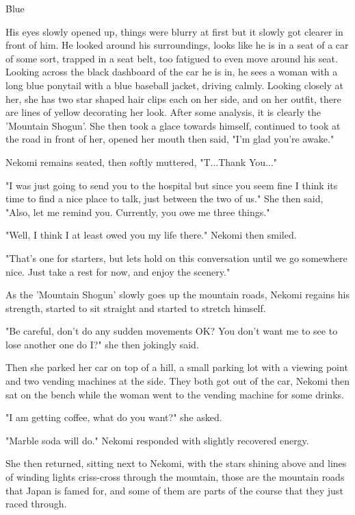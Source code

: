 \h{Blue}

His eyes slowly opened up, things were blurry at first but it slowly got clearer in front of him. He looked around his surroundings, looks like he is in a seat of a car of some sort, trapped in a seat belt, too fatigued to even move around his seat. 
Looking across the black dashboard of the car he is in, he sees a woman with a long blue ponytail with a blue baseball jacket, driving calmly.
Looking closely at her, she has two star shaped hair clips each on her side, and on her outfit, there are lines of yellow decorating her look. 
After some analysis, it is clearly the 'Mountain Shogun'.
She then took a glace towards himself, continued to took at the road in front of her, opened her mouth then said, "I'm glad you're awake."

Nekomi remains seated, then softly muttered, "T...Thank You..."

"I was just going to send you to the hospital but since you seem fine I think its time to find a nice place to talk, just between the two of us." She then said, "Also, let me remind you. Currently, you owe me three things."

"Well, I think I at least owed you my life there." Nekomi then smiled.

"That's one for starters, but lets hold on this conversation until we go somewhere nice. Just take a rest for now, and enjoy the scenery."

As the 'Mountain Shogun' slowly goes up the mountain roads, Nekomi regains his strength, started to sit straight and started to stretch himself.

"Be careful, don't do any sudden movements OK? You don't want me to see to lose another one do I?" she then jokingly said.

Then she parked her car on top of a hill, a small parking lot with a viewing point and two vending machines at the side. They both got out of the car, Nekomi then sat on the bench while the woman went to the vending machine for some drinks.

"I am getting coffee, what do you want?" she asked.

"Marble soda will do." Nekomi responded with slightly recovered energy.

She then returned, sitting next to Nekomi, with the stars shining above and lines of winding lights criss-cross through the mountain, those are the mountain roads that Japan is famed for, and some of them are parts of the course that they just raced through.

